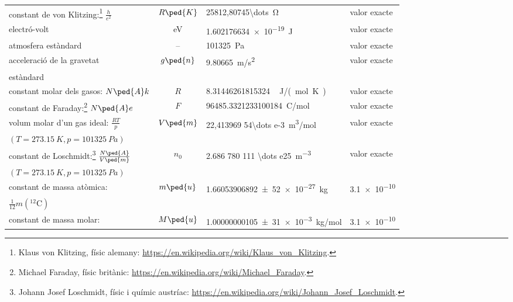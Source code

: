 \begin{ThreePartTable}
\begin{longtable}{lcll}
     constant de von Klitzing:\footnote{Klaus von Klitzing, físic alemany: \href{https://en.wikipedia.org/wiki/Klaus_von_Klitzing}{https:/\!\!/en.wikipedia.org/wiki/Klaus\_von\_Klitzing}.} $\frac{h}{e^2}$ & $R\ped{K}$ & \qty{25812,80745\dots}{\ohm} & valor exacte\index{constants!de von Klitzing}\index{RK@$R\ped{K}$}\\[0.9em]
	electró-volt\tnote{\color{blue}(d)} & eV & \qty{1,602176634e-19}{J} & valor exacte\index{electró-volt}\index{eV}\\[0.6em]
	atmosfera estàndard  & -- & \qty{101325}{Pa} & valor exacte\index{atmosfera estàndard}\\[0.8em]
	acceleració de la gravetat & $g\ped{n}$ & \qty{9,80665}{m/s^2} & valor exacte \\
	estàndard & & &\index{acceleració!de la gravetat estàndard}\index{gn@$g\ped{n}$}\\[0.9em]
	constant molar dels gasos: $N\ped{A} k$ & $R$ & \qty{8,31446261815324}{\,J/(mol.K)} & valor exacte\index{constants!molar dels gasos}\index{R@$R$}\\[0.8em]
	constant de Faraday:\footnote{Michael Faraday, físic britànic: \href{https://en.wikipedia.org/wiki/Michael_Faraday}{https:/\!\!/en.wikipedia.org/wiki/Michael\_Faraday}.} $N\ped{A} e$ & $F$ & \qty{96485,3321233100184}{C/mol} & valor exacte\index{constants!de Faraday}\index{F@$F$}\\[0.9em]
	volum molar d'un gas ideal: $\frac{R T}{p}$  & $V\ped{m}$ & \qty{22,413969 54\dots e-3}{m^3/mol} & valor exacte\index{volum molar d'un gas ideal}\index{Vm@$V\ped{m}$}\\
	{\small$(T=\qty{273,15}{K}, p=\qty{101325}{Pa})$} & & & \\[0.8em]	
	constant de Loschmidt:\footnote{Johann Josef Loschmidt, físic i químic austríac: \href{https://en.wikipedia.org/wiki/Johann_Josef_Loschmidt}{https:/\!\!/en.wikipedia.org/wiki/Johann\_Josef\_Loschmidt}.} $\frac{N\ped{A}}{V\ped{m}}$  & $n_0$ & \qty{2.686 780 111 \dots e25}{m^{-3}} & valor exacte\index{constants!de Loschmidt}\index{n0@$n_0$}\\
	{\small$(T=\qty{273,15}{K}, p=\qty{101325}{Pa})$} & & & \\[0.8em]	
	constant de massa atòmica:\tnote{\color{blue}(c)} & $m\ped{u}$ & \qty{1,66053906892(52)e-27}{kg} & \num{3.1e-10}\\ 
	$\frac{1}{12}  m({}^{12}\mathrm{C})$ & & &\index{constants!de massa atòmica}\index{mu@$m\ped{u}$}\\[0.9em]
	constant de massa molar:\tnote{\color{blue}(c)} & $M\ped{u}$ & \qty{1,00000000105(31)e-3}{kg/mol} & \num{3.1e-10}\index{constants!de massa molar}\index{Mu@$M\ped{u}$}\\ 

\end{longtable}
\end{ThreePartTable}
